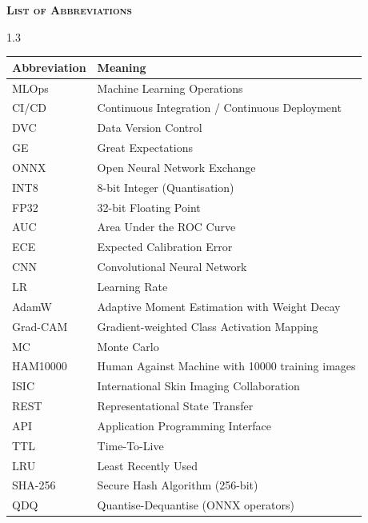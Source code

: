 \begin{center}
\vspace*{3cm}
\textsc{\huge \bfseries List of Abbreviations}\\[1cm]
\end{center}

\begin{spacing}{1.3}
\begin{table}[H]
\centering
\begin{tabular}{ll}
\toprule
\textbf{Abbreviation} & \textbf{Meaning} \\
\midrule
MLOps    & Machine Learning Operations \\
CI/CD    & Continuous Integration / Continuous Deployment \\
DVC      & Data Version Control \\
GE       & Great Expectations \\
ONNX     & Open Neural Network Exchange \\
INT8     & 8-bit Integer (Quantisation) \\
FP32     & 32-bit Floating Point \\
AUC      & Area Under the ROC Curve \\
ECE      & Expected Calibration Error \\
CNN      & Convolutional Neural Network \\
LR       & Learning Rate \\
AdamW    & Adaptive Moment Estimation with Weight Decay \\
Grad-CAM & Gradient-weighted Class Activation Mapping \\
MC       & Monte Carlo \\
HAM10000 & Human Against Machine with 10000 training images \\
ISIC     & International Skin Imaging Collaboration \\
REST     & Representational State Transfer \\
API      & Application Programming Interface \\
TTL      & Time-To-Live \\
LRU      & Least Recently Used \\
SHA-256  & Secure Hash Algorithm (256-bit) \\
QDQ      & Quantise-Dequantise (ONNX operators) \\
\bottomrule
\end{tabular}
\end{table}
\end{spacing}
